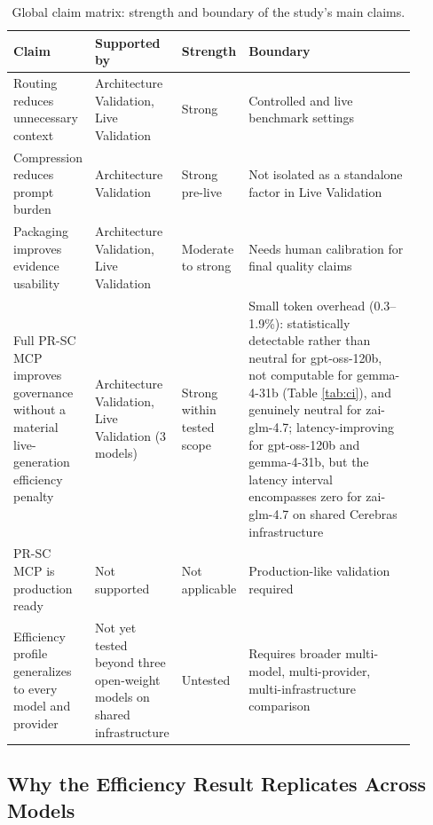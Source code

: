 \begin{table}[!t]
  \caption{Global claim matrix: strength and boundary of the study's main claims.}
  \label{tab:claims}
  \begin{tabular}{p{0.2\linewidth}p{0.16\linewidth}p{0.12\linewidth}p{0.42\linewidth}}
    \toprule
    \textbf{Claim} & \textbf{Supported by} & \textbf{Strength} & \textbf{Boundary} \\
    \midrule
    Routing reduces unnecessary context & Architecture Validation, Live Validation & Strong & Controlled and live benchmark settings \\
    Compression reduces prompt burden & Architecture Validation & Strong pre-live & Not isolated as a standalone factor in Live Validation \\
    Packaging improves evidence usability & Architecture Validation, Live Validation & Moderate to strong & Needs human calibration for final quality claims \\
    Full PR-SC MCP improves governance without a material live-generation efficiency penalty & Architecture Validation, Live Validation (3 models) & Strong within tested scope & Small token overhead (0.3--1.9\%): statistically detectable rather than neutral for gpt-oss-120b, not computable for gemma-4-31b (Table \ref{tab:ci}), and genuinely neutral for zai-glm-4.7; latency-improving for gpt-oss-120b and gemma-4-31b, but the latency interval encompasses zero for zai-glm-4.7 on shared Cerebras infrastructure \\
    PR-SC MCP is production ready & Not supported & Not applicable & Production-like validation required \\
    Efficiency profile generalizes to every model and provider & Not yet tested beyond three open-weight models on shared infrastructure & Untested & Requires broader multi-model, multi-provider, multi-infrastructure comparison \\
    \bottomrule
  \end{tabular}
\end{table}

\subsection{Why the Efficiency Result Replicates Across Models}

